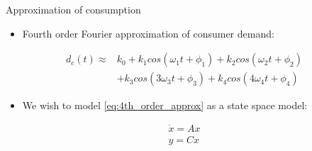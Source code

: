 	\begin{frame}{Approximation of consumption}
		
	\begin{itemize}
		\item Fourth order Fourier approximation of consumer demand:
	\end{itemize}
		
	\begin{equation} \label{eq:4th_order_approx}
		\begin{split}
			d_c(t) \approx& k_0 + k_1 cos(\omega_1 t + \phi_1) + k_2 cos(\omega_2 t + \phi_2)\\
			&+ k_3 cos(3\omega_3 t + \phi_3) + k_4 cos(4\omega_4 t + \phi_4)
		\end{split}
	\end{equation}

	\begin{itemize}
		\item We wish to model \ref{eq:4th_order_approx} as a state space model:
	\end{itemize}
		
			\begin{equation*}
			\begin{split}
				\dot{x}=Ax\\
				y=Cx
			\end{split}
		\end{equation*}	
	\end{frame}
